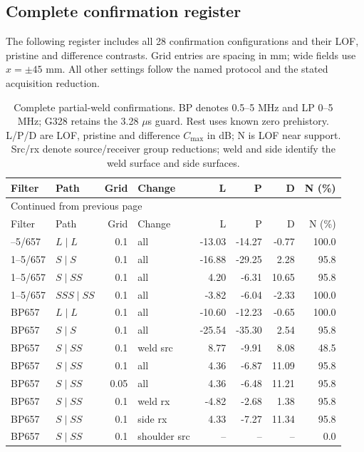 \subsection{Complete confirmation register}
The following register includes all 28 confirmation configurations and their LOF, pristine and difference contrasts. Grid entries are spacing in mm; wide fields use $x=\pm45$ mm. All other settings follow the named protocol and the stated acquisition reduction.
{\small\setlength{\tabcolsep}{4pt}
\begin{longtable}{@{}llrlrrrr@{}}
\caption{Complete partial-weld confirmations. BP denotes 0.5--5 MHz and LP 0--5 MHz; G328 retains the 3.28 $\mu$s guard. Rest uses known zero prehistory. L/P/D are LOF, pristine and difference $C_{\max}$ in dB; N is LOF near support. Src/rx denote source/receiver group reductions; weld and side identify the weld surface and side surfaces.}\label{saftapp:archive:partial:register}\\
\toprule Filter & Path & Grid & Change & L & P & D & N (\%)\\\midrule\endfirsthead
\multicolumn{8}{l}{\small Continued from previous page}\\\toprule Filter & Path & Grid & Change & L & P & D & N (\%)\\\midrule\endhead
\bottomrule\endfoot
1--5/657 & $L\mid L$ & 0.1 & all & -13.03 & -14.27 & -0.77 & 100.0 \\
1--5/657 & $S\mid S$ & 0.1 & all & -16.88 & -29.25 & 2.28 & 95.8 \\
1--5/657 & $S\mid SS$ & 0.1 & all & 4.20 & -6.31 & 10.65 & 95.8 \\
1--5/657 & $SSS\mid SS$ & 0.1 & all & -3.82 & -6.04 & -2.33 & 100.0 \\
BP657 & $L\mid L$ & 0.1 & all & -10.60 & -12.23 & -0.65 & 100.0 \\
BP657 & $S\mid S$ & 0.1 & all & -25.54 & -35.30 & 2.54 & 95.8 \\
BP657 & $S\mid SS$ & 0.1 & weld src & 8.77 & -9.91 & 8.08 & 48.5 \\
BP657 & $S\mid SS$ & 0.1 & all & 4.36 & -6.87 & 11.09 & 95.8 \\
BP657 & $S\mid SS$ & 0.05 & all & 4.36 & -6.48 & 11.21 & 95.8 \\
BP657 & $S\mid SS$ & 0.1 & weld rx & -4.82 & -2.68 & 1.38 & 95.8 \\
BP657 & $S\mid SS$ & 0.1 & side rx & 4.33 & -7.27 & 11.34 & 95.8 \\
BP657 & $S\mid SS$ & 0.1 & shoulder src & -- & -- & -- & 0.0 \\

\end{longtable}}
